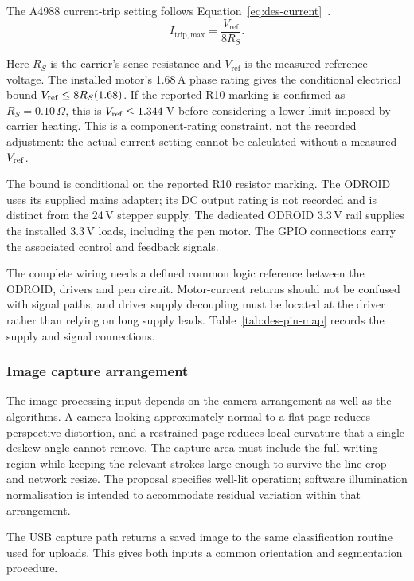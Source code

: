 The A4988 current-trip setting follows Equation~\ref{eq:des-current}~\cite[p.~9]{a4988ds}.
\begin{equation}
I_{\mathrm{trip,max}}=\frac{V_{\mathrm{ref}}}{8R_S}.
\label{eq:des-current}
\end{equation}

Here $R_S$ is the carrier's sense resistance and $V_{\mathrm{ref}}$ is the measured reference voltage. The installed motor's 1.68\,A phase rating gives the conditional electrical bound $V_{\rm ref}\leq8R_S(1.68)$. If the reported R10 marking is confirmed as $R_S=0.10\,\Omega$, this is $V_{\rm ref}\leq1.344$\,V before considering a lower limit imposed by carrier heating. This is a component-rating constraint, not the recorded adjustment: the actual current setting cannot be calculated without a measured $V_{\rm ref}$.

The bound is conditional on the reported R10 resistor marking. The ODROID uses its supplied mains adapter; its DC output rating is not recorded and is distinct from the 24\,V stepper supply. The dedicated ODROID 3.3\,V rail supplies the installed 3.3\,V loads, including the pen motor. The GPIO connections carry the associated control and feedback signals.

The complete wiring needs a defined common logic reference between the ODROID, drivers and pen circuit. Motor-current returns should not be confused with signal paths, and driver supply decoupling must be located at the driver rather than relying on long supply leads. Table~\ref{tab:des-pin-map} records the supply and signal connections.

\subsubsection{Image capture arrangement}
\label{sec:des-camera}
The image-processing input depends on the camera arrangement as well as the algorithms. A camera looking approximately normal to a flat page reduces perspective distortion, and a restrained page reduces local curvature that a single deskew angle cannot remove. The capture area must include the full writing region while keeping the relevant strokes large enough to survive the line crop and network resize. The proposal specifies well-lit operation; software illumination normalisation is intended to accommodate residual variation within that arrangement.

The USB capture path returns a saved image to the same classification routine used for uploads. This gives both inputs a common orientation and segmentation procedure.

